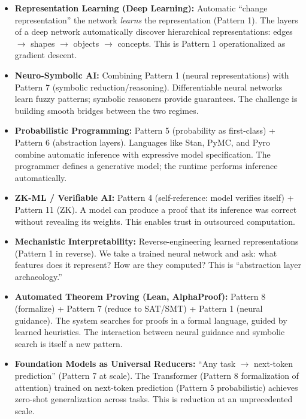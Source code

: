 \begin{itemize}
\item \textbf{Representation Learning (Deep Learning):} Automatic ``change representation'' the network \emph{learns} the representation (Pattern 1). The layers of a deep network automatically discover hierarchical representations: edges $\to$ shapes $\to$ objects $\to$ concepts. This is Pattern 1 operationalized as gradient descent.

\item \textbf{Neuro-Symbolic AI:} Combining Pattern 1 (neural representations) with Pattern 7 (symbolic reduction/reasoning). Differentiable neural networks learn fuzzy patterns; symbolic reasoners provide guarantees. The challenge is building smooth bridges between the two regimes.

\item \textbf{Probabilistic Programming:} Pattern 5 (probability as first-class) + Pattern 6 (abstraction layers). Languages like Stan, PyMC, and Pyro combine automatic inference with expressive model specification. The programmer defines a generative model; the runtime performs inference automatically.

\item \textbf{ZK-ML / Verifiable AI:} Pattern 4 (self-reference: model verifies itself) + Pattern 11 (ZK). A model can produce a proof that its inference was correct without revealing its weights. This enables trust in outsourced computation.

\item \textbf{Mechanistic Interpretability:} Reverse-engineering learned representations (Pattern 1 in reverse). We take a trained neural network and ask: what features does it represent? How are they computed? This is ``abstraction layer archaeology.''

\item \textbf{Automated Theorem Proving (Lean, AlphaProof):} Pattern 8 (formalize) + Pattern 7 (reduce to SAT/SMT) + Pattern 1 (neural guidance). The system searches for proofs in a formal language, guided by learned heuristics. The interaction between neural guidance and symbolic search is itself a new pattern.

\item \textbf{Foundation Models as Universal Reducers:} ``Any task $\to$ next-token prediction'' (Pattern 7 at scale). The Transformer (Pattern 8 formalization of attention) trained on next-token prediction (Pattern 5 probabilistic) achieves zero-shot generalization across tasks. This is reduction at an unprecedented scale.


\end{itemize}

